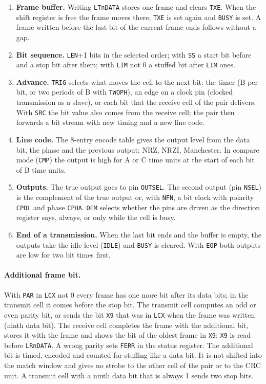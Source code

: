 \documentclass[10pt,a4paper]{article}
\newcommand{\reg}[1]{\texttt{#1}}
\begin{document}
\begin{enumerate}
\item \textbf{Frame buffer.} Writing \reg{LTnDATA} stores one frame and clears \reg{TXE}. When the shift register
is free the frame moves there, \reg{TXE} is set again and \reg{BUSY} is set. A frame written before the last bit
of the current frame ends follows without a gap.
\item \textbf{Bit sequence.} \reg{LEN}+1 bits in the selected order; with \reg{SS} a start bit before and a stop bit
after them; with \reg{LIM} not 0 a stuffed bit after \reg{LIM} ones.
\item \textbf{Advance.} \reg{TRIG} selects what moves the cell to the next bit: the timer (B per bit, or two
periods of B with \reg{TWOPH}), an edge on a clock pin (clocked transmission as a slave), or each bit that the
receive cell of the pair delivers. With \reg{SRC} the bit value also comes from the receive cell; the pair then
forwards a bit stream with new timing and a new line code.
\item \textbf{Line code.} The 8-entry encode table gives the output level from the data bit, the phase and the
previous output: NRZ, NRZI, Manchester. In compare mode (\reg{CMP}) the output is high for A or C time units at
the start of each bit of B time units.
\item \textbf{Outputs.} The true output goes to pin \reg{OUTSEL}. The second output (pin \reg{NSEL}) is the complement
of the true output or, with \reg{NFN}, a bit clock with polarity \reg{CPOL} and phase \reg{CPHA}. \reg{OEM} selects
whether the pins are driven as the direction register says, always, or only while the cell is busy.
\item \textbf{End of a transmission.} When the last bit ends and the buffer is empty, the outputs take the idle
level (\reg{IDLE}) and \reg{BUSY} is cleared. With \reg{EOP} both outputs are low for two bit times first.
\end{enumerate}

\paragraph{Additional frame bit.} With \reg{PAR} in \reg{LCX} not 0 every frame has one more bit after its data
bits; in the transmit cell it comes before the stop bit. The transmit cell computes an odd or even parity bit,
or sends the bit \reg{X9} that was in \reg{LCX} when the frame was written (ninth data bit). The receive cell
completes the frame with the additional bit, stores it with the frame and shows the bit of the oldest frame in
\reg{X9}; \reg{X9} is read before \reg{LRnDATA}. A wrong parity sets \reg{FERR} in the status register. The
additional bit is timed, encoded and counted for stuffing like a data bit. It is not shifted into the match
window and gives no strobe to the other cell of the pair or to the CRC unit. A transmit cell with a ninth data
bit that is always 1 sends two stop bits.
\end{document}
